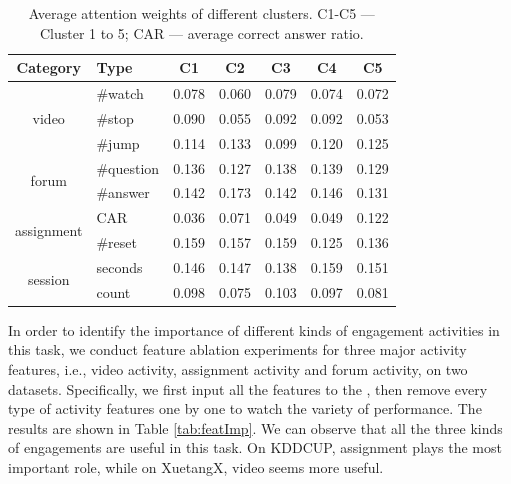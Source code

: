 	\begin{table}
    	\centering
    	\caption{Average attention weights of different clusters. C1-C5 --- Cluster 1 to 5; CAR --- average correct answer ratio. }
    	\small
    	\label{tab:AttnWeight}
    	\setlength{\tabcolsep}{1.8mm}\begin{tabular}{@{}c@{}|l@{}|c|c|c|c|c@{}}
    		\hline
    		\hline
    		Category &  Type   & C1& C2 & C3& C4&C5 \\
    		\hline
    		\multirow{3}{*}{video}&  \#watch &0.078 &0.060 &0.079&0.074 & 0.072\\	
    		\cline{2-7}
    		& \#stop     &0.090 & 0.055 & 0.092&0.092& 0.053\\
    		\cline{2-7}
    		& \#jump   &0.114 & 0.133 & 0.099&0.120& 0.125\\
    		\hline
    		\multirow{2}{*}{forum}&  \#question & 0.136 & 0.127 &0.138 & 0.139 & 0.129 \\
    		\cline{2-7}
    		& \#answer &0.142 &0.173&0.142&0.146&0.131\\
    		\hline
    		\multirow{2}{*}{assignment} & CAR &0.036 & 0.071 & 0.049& 0.049 & 0.122\\
    		\cline{2-7}
    		& \#reset  &0.159 & 0.157& 0.159& 0.125& 0.136\\
    		\hline
    		\multirow{2}{*}{session}    & seconds &0.146 &0.147& 0.138& 0.159& 0.151\\
    		\cline{2-7}                
    		&  count     &0.098 &0.075& 0.103&0.097& 0.081\\ 
    		\hline	
    		\hline
    	\end{tabular}
    	\normalsize
    \end{table}  
	
 	 In order to identify the importance of different kinds of engagement activities in this task, we conduct feature ablation experiments for three major activity features, i.e., video activity, assignment activity and forum activity, on two datasets. Specifically, we first input all the features to the \modelname{}, then remove every type of activity features one by one to watch the variety of performance. The results are shown in Table \ref{tab:featImp}. We can observe that all the three kinds of engagements are useful in this task. On KDDCUP, assignment plays the most important role, while on XuetangX, video seems more useful. 
 	 
